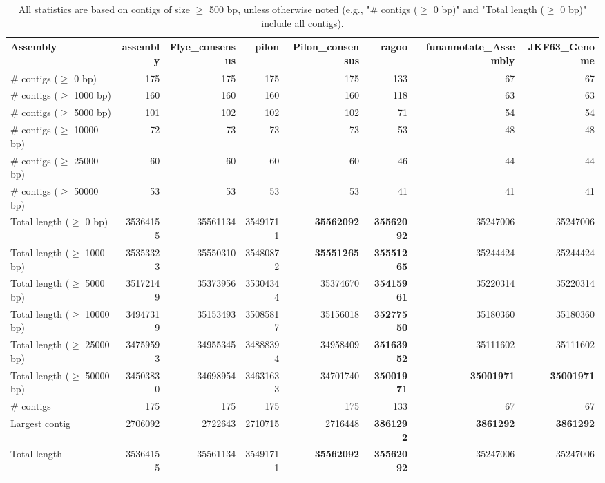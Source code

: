\documentclass[12pt,a4paper]{article}
\begin{document}
\begin{table}[ht]
\begin{center}
\caption{All statistics are based on contigs of size $\geq$ 500 bp, unless otherwise noted (e.g., "\# contigs ($\geq$ 0 bp)" and "Total length ($\geq$ 0 bp)" include all contigs).}
\begin{tabular}{|l*{7}{|r}|}
\hline
Assembly & assembly & Flye\_consensus & pilon & Pilon\_consensus & ragoo & funannotate\_Assembly & JKF63\_Genome \\ \hline
\# contigs ($\geq$ 0 bp) & 175 & 175 & 175 & 175 & 133 & 67 & 67 \\ \hline
\# contigs ($\geq$ 1000 bp) & 160 & 160 & 160 & 160 & 118 & 63 & 63 \\ \hline
\# contigs ($\geq$ 5000 bp) & 101 & 102 & 102 & 102 & 71 & 54 & 54 \\ \hline
\# contigs ($\geq$ 10000 bp) & 72 & 73 & 73 & 73 & 53 & 48 & 48 \\ \hline
\# contigs ($\geq$ 25000 bp) & 60 & 60 & 60 & 60 & 46 & 44 & 44 \\ \hline
\# contigs ($\geq$ 50000 bp) & 53 & 53 & 53 & 53 & 41 & 41 & 41 \\ \hline
Total length ($\geq$ 0 bp) & 35364155 & 35561134 & 35491711 & {\bf 35562092} & {\bf 35562092} & 35247006 & 35247006 \\ \hline
Total length ($\geq$ 1000 bp) & 35353323 & 35550310 & 35480872 & {\bf 35551265} & {\bf 35551265} & 35244424 & 35244424 \\ \hline
Total length ($\geq$ 5000 bp) & 35172149 & 35373956 & 35304344 & 35374670 & {\bf 35415961} & 35220314 & 35220314 \\ \hline
Total length ($\geq$ 10000 bp) & 34947319 & 35153493 & 35085817 & 35156018 & {\bf 35277550} & 35180360 & 35180360 \\ \hline
Total length ($\geq$ 25000 bp) & 34759593 & 34955345 & 34888394 & 34958409 & {\bf 35163952} & 35111602 & 35111602 \\ \hline
Total length ($\geq$ 50000 bp) & 34503830 & 34698954 & 34631633 & 34701740 & {\bf 35001971} & {\bf 35001971} & {\bf 35001971} \\ \hline
\# contigs & 175 & 175 & 175 & 175 & 133 & 67 & 67 \\ \hline
Largest contig & 2706092 & 2722643 & 2710715 & 2716448 & {\bf 3861292} & {\bf 3861292} & {\bf 3861292} \\ \hline
Total length & 35364155 & 35561134 & 35491711 & {\bf 35562092} & {\bf 35562092} & 35247006 & 35247006 \\ \hline

\end{tabular}
\end{center}
\end{table}
\end{document}
